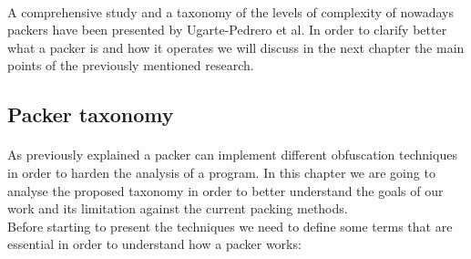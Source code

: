 \paragraph{}
A comprehensive study and a taxonomy of the levels of complexity of nowadays packers have been presented by Ugarte-Pedrero et al\cite{sokpacker}. 
In order to clarify better what a packer is and how it operates we will discuss in the next chapter the main points of the previously mentioned research.

\subsection{Packer taxonomy}
\paragraph{}
As previously explained a packer can implement different obfuscation techniques in order to harden the analysis of a program. In this chapter we are going to analyse the proposed taxonomy in order to better understand the goals of our work and its limitation against the current packing methods.\\
Before starting to present the techniques we need to define some terms that are essential in order to understand how a packer works: 
